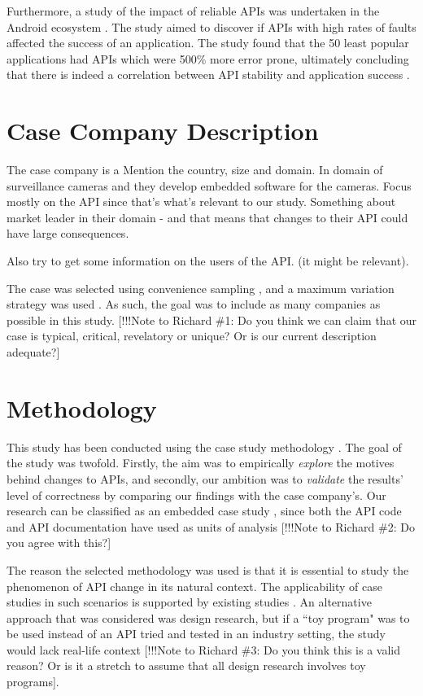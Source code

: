 \documentclass[10pt,twocolumn]{article}
\begin{document}
Furthermore, a study of the impact of reliable APIs was undertaken in the Android ecosystem \cite{mcdonnell2013empirical}. The study aimed to discover if APIs with high rates of faults affected the success of an application. The study found that the 50 least popular applications had APIs which were 500\% more error prone, ultimately concluding that there is indeed a correlation between API stability and application success \cite{mcdonnell2013empirical}. 

\section{Case Company Description}
The case company is a 
Mention the country, size and domain. 
In domain of surveillance cameras and they develop embedded software for the cameras. 
Focus mostly on the API since that's what's relevant to our study. 
Something about market leader in their domain - and that means that changes to their API could have large consequences. 

Also try to get some information on the users of the API. (it might be relevant). %

The case was selected using convenience sampling \cite{flyvbjerg2006five}, and a maximum variation strategy was used \cite{benbasat1987case}. As such, the goal was to include as many companies as possible in this study. [!!!Note to Richard \#1: Do you think we can claim that our case is typical, critical, revelatory or unique? Or is our current description adequate?]



\section{Methodology}
This study has been conducted using the case study methodology \cite{runeson2009guidelines}. The goal of the study was twofold. Firstly, the aim was to empirically \textit{explore} the motives behind changes to APIs, and secondly, our ambition was to \textit{validate} the results' level of correctness by comparing our findings with the case company's. Our research can be classified as an embedded case study \cite{yin2013case}, since both the API code and API documentation have used as units of analysis [!!!Note to Richard \#2: Do you agree with this?] 

The reason the selected methodology was used is that it is essential to study the phenomenon of API change in its natural context. The applicability of case studies in such scenarios is supported by existing studies \cite{runeson2009guidelines} \cite{benbasat1987case} \cite{yin2013case} \cite{robson2002real}. An alternative approach that was considered was design research, but if a ``toy program" was to be used instead of an API tried and tested in an industry setting, the study would lack real-life context \cite{runeson2009guidelines} [!!!Note to Richard \#3: Do you think this is a valid reason? Or is it a stretch to assume that all design research involves toy programs]. 
\end{document}
